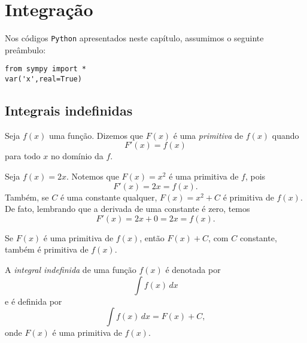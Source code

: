 
\chapter{Integração}\label{cap_int}
\thispagestyle{fancy}

\ifispython
\begin{obs}\label{obs:cap_int_python}
  Nos códigos \verb+Python+ apresentados neste capítulo, assumimos o seguinte preâmbulo:
\begin{verbatim}
from sympy import *
var('x',real=True)
\end{verbatim}
\end{obs}
\fi

\section{Integrais indefinidas}

Seja $f(x)$ uma função. Dizemos que $F(x)$ é uma \emph{primitiva} de $f(x)$ quando
\begin{equation}
  F'(x) = f(x)
\end{equation}
para todo $x$ no domínio da $f$.

\begin{ex}\label{ex:primitiva}
  Seja $f(x) = 2x$. Notemos que $F(x) = x^2$ é uma primitiva de $f$, pois
  \begin{equation}
    F'(x) = 2x = f(x).
  \end{equation}
  Também, se $C$ é uma constante qualquer, $F(x) = x^2 + C$ é primitiva de $f(x)$. De fato, lembrando que a derivada de uma constante é zero, temos
  \begin{equation}
    F'(x) = 2x + 0 = 2x = f(x).
  \end{equation}
\end{ex}

\begin{obs}
  Se $F(x)$ é uma primitiva de $f(x)$, então $F(x)+C$, com $C$ constante, também é primitiva de $f(x)$.
\end{obs}

A \emph{integral indefinida} de uma função $f(x)$ é denotada por
\begin{equation}
  \int f(x)\,dx
\end{equation}
e é definida por
\begin{equation}
  \int f(x)\,dx = F(x) + C,
\end{equation}
onde $F(x)$ é uma primitiva de $f(x)$.

